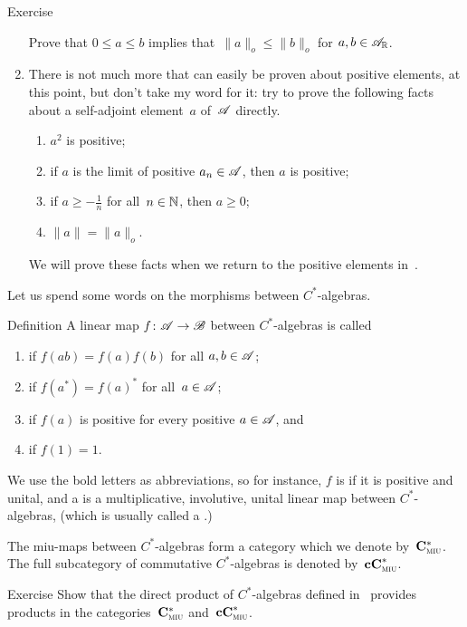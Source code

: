 \documentclass[main]{subfiles}
\begin{document}
\begin{parsec}
\begin{point}{Exercise}
\begin{enumerate}
Prove that $0\leq a\leq b$ implies that~$\|a\|_o\leq\|b\|_o$
for $a,b\in\mathscr{A}_{\mathbb{R}}$.

\item
There is not much more that can easily be
proven about positive elements, at this point,
but don't take my word for it:
try to prove the following facts
about a self-adjoint element~$a$ of~$\mathscr{A}$ directly.
\begin{enumerate}
\item $a^2$ is positive;
\item if $a$ is the limit of positive $a_n\in\mathscr{A}$,
then $a$ is positive;
\item if $a\geq -\frac{1}{n}$ for all~$n\in \mathbb{N}$, then $a\geq 0$;
\item  $\|a\|=\|a\|_o$.
\end{enumerate}
We will prove these facts
when we return to the positive elements in~.
\end{enumerate}
\end{point}
\end{parsec}

\begin{parsec}%
\begin{point}%
Let us spend some words
on the morphisms between $C^*$-algebras.
\end{point}
\begin{point}{Definition}
A linear map $f\colon \mathscr{A} \to \mathscr{B}$
between $C^*$-algebras
is called
\begin{enumerate}
\item
{}
if $f(ab)=f(a)f(b)$ for all $a,b\in\mathscr{A}$;
\item
{}
if $f(a^*)=f(a)^*$ for all~$a\in\mathscr{A}$;
\item
{}
if $f(a)$ is positive
for every positive $a\in\mathscr{A}$, and
\item
{}
if $f(1)=1$.
\end{enumerate}
\begin{point}%
We use the bold letters as abbreviations,
so for instance,
$f$ is  if it is positive and unital,
and a 
is a multiplicative, involutive, unital linear map between $C^*$-algebras,
(which is usually called a .)
\end{point}
\begin{point}%
The miu-maps between $C^*$-algebras
form a category which we denote by~$\mathbf{C}^*_{\text{\textsc{miu}}}$.
The full subcategory of commutative $C^*$-algebras
is denoted by~$\mathbf{cC}^*_{\text{\textsc{miu}}}$.
\end{point}
\end{point}
\begin{point}{Exercise}%
Show that the direct product of $C^*$-algebras
defined in~
provides products in the categories~$\mathbf{C}^*_{\text{\textsc{miu}}}$
and~$\mathbf{cC}^*_{\text{\textsc{miu}}}$.
\end{point}

\end{parsec}
\end{document}
